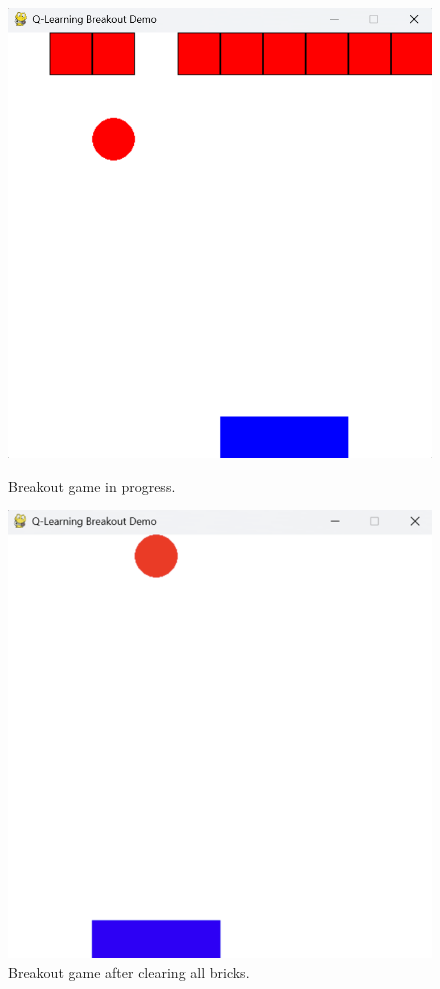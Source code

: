 \documentclass{article}
\begin{document}
\begin{figure}[H]
    \centering
    \begin{minipage}[t]{0.48\textwidth}
        \centering
        \includegraphics[width=\textwidth]{Figure_3.png}
        \caption{Breakout game in progress.}
        \label{fig:figure3}
    \end{minipage}
    \hfill
    \begin{minipage}[t]{0.48\textwidth}
        \centering
        \includegraphics[width=\textwidth]{Figure_4.png}
        \caption{Breakout game after clearing all bricks.}
        \label{fig:figure4}
    \end{minipage}
\end{figure}
\end{document}
